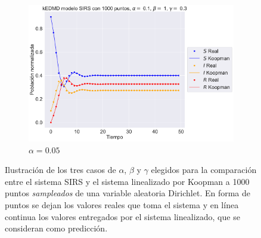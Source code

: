 \begin{figure}[h]
\begin{subfigure}[b]{0.45\textwidth}
        \includegraphics[width=\textwidth]{img/content/chapter3/SIRS3.pdf}
        \caption{$\alpha=0.05$}
    \end{subfigure}
    \caption{Ilustración de los tres casos de $\alpha$, $\beta$ y $\gamma$ elegidos para la comparación entre el sistema SIRS y el sistema linealizado por Koopman a 1000 puntos \textit{sampleados} de una variable aleatoria Dirichlet. En forma de puntos se dejan los valores reales que toma el sistema y en línea continua los valores entregados por el sistema linealizado, que se consideran como predicción.}
    \label{fig:Comp_traj_SIRS}
\end{figure}
